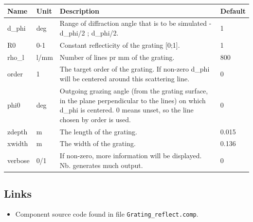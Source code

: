\begin{longtable}{p{}p{}p{}p{}}
\toprule
\textbf{Name} & \textbf{Unit} & \textbf{Description} & \textbf{Default} \\
\midrule
\endhead
d\_phi & deg & Range of diffraction angle that is to be simulated -d\_phi/2 ; d\_phi/2. & 1 \\
R0 & 0-1 & Constant reflecticity of the grating [0;1]. & 1 \\
rho\_l & l/mm & Number of lines pr mm of the grating. & 800 \\
order & 1 & The target order of the grating. If non-zero d\_phi will be centered around this scattering line. & 0 \\
phi0 & deg & Outgoing grazing angle (from the grating surface, in the plane perpendicular to the lines) on which d\_phi is centered. 0 means unset, so the line chosen by order is used. & 0 \\
zdepth & m & The length of the grating. & 0.015 \\
xwidth & m & The width of the grating. & 0.136 \\
verbose & 0/1 & If non-zero, more information will be displayed. Nb. generates much output. & 0 \\
\bottomrule
\end{longtable}

\subsection*{Links}
\begin{itemize}
  \item Component source code found in file \texttt{Grating\_reflect.comp}.
\end{itemize}

